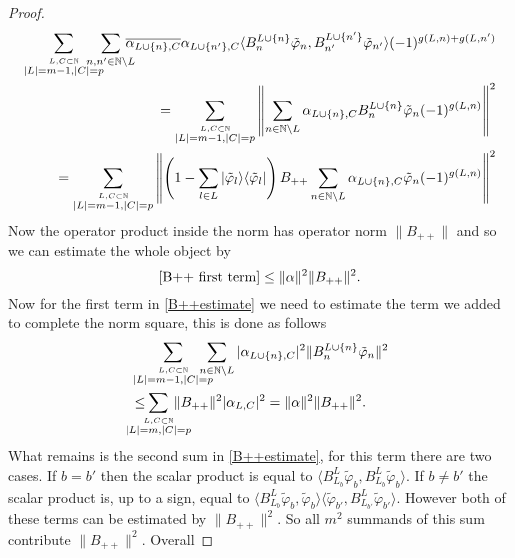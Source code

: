 \documentclass[b5paper,draft,openbib,12pt]{memoir}
\begin{document}
\begin{proof}
\begin{align}\nonumber
\sum_{\overset{L,C\subset \mathbb{N}}{|L|=m-1,|C|=p}}\hspace{-0.5cm}\sum_{n,n'\in\mathbb{N}\backslash L} \hspace{-0.3cm}\overline{\alpha_{L\cup\{n\},C}}\alpha_{L\cup\{n'\},C} 
 \langle B^{L\cup\{n\}}_n \tilde{\varphi}_{n}, B^{L\cup\{n'\}}_{n'}\tilde{\varphi}_{n'}\rangle (-1)^{g(L,n)+g(L,n')}\\
 =\sum_{\overset{L,C\subset \mathbb{N}}{|L|=m-1,|C|=p}}\left\|\sum_{n\in\mathbb{N}\backslash L}\alpha_{L\cup\{n\},C}  B^{L\cup\{n\}}_n \tilde{\varphi}_{n} (-1)^{g(L,n)} \right\|^2\\\label{B++ first term}
  =\sum_{\overset{L,C\subset \mathbb{N}}{|L|=m-1,|C|=p}}\left\|\left(1-\sum_{l\in L}|\tilde{\varphi}_l\rangle\langle \tilde{\varphi}_l | \right)B_{++}\sum_{n\in\mathbb{N}\backslash L}\alpha_{L\cup\{n\},C}  \tilde{\varphi}_{n} (-1)^{g(L,n)} \right\|^2
\end{align}
Now the operator product inside the norm has operator norm \(\|B_{++}\|\) and so we can estimate the whole object by
\begin{equation}\label{B++estimatefinal1}
\eqref{B++ first term}\le \|\alpha\|^2 \|B_{++}\|^2.
\end{equation}
Now for the first term in \eqref{B++estimate} we need to estimate the term we added to complete the norm square, this is done as follows
\begin{align}\nonumber
&\sum_{\overset{L,C\subset\mathbb{N}}{|L|=m-1,|C|=p}} \hspace{-0.4cm}\sum_{n\in\mathbb{N}\backslash L} |\alpha_{L\cup\{n\},C}|^2 \|B_n^{L\cup\{n\}} \tilde{\varphi}_{n}\|^2\\\label{B++estimatefinal2}
&\le \hspace{-0.6cm}\sum_{\overset{L,C\subset\mathbb{N}}{|L|=m,|C|=p}}\hspace{-0.5cm} \|B_{++}\|^2|\alpha_{L,C}|^2 =\|\alpha\|^2 \|B_{++}\|^2.
\end{align}
What remains is the second sum in \eqref{B++estimate}, for this term there are two cases.  If \(b=b'\) then the scalar product is 
equal to \(\langle B_{L_b}^L \tilde{\varphi}_b, B_{L_{b}}^L \tilde{\varphi}_{b}\rangle\). If \(b\neq b'\) the scalar product is, up to a sign,
equal to \(\langle B_{L_b}^L \tilde{\varphi}_b,\tilde{\varphi}_{b}\rangle \langle \tilde{\varphi}_{b'}, B_{L_{b'}}^L \tilde{\varphi}_{b'}\rangle\).
However both of these terms can be estimated by \(\|B_{++}\|^2\). So all \(m^2\) summands of this sum contribute \(\|B_{++}\|^2\). Overall 

\end{proof}
\end{document}
